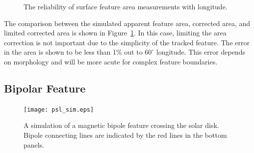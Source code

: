 \begin{figure}[!ht]
\caption{The reliability of surface feature area measurements with longitude.}\label{fig:spotareaerr}
\end{figure}

The comparison between the simulated apparent feature area, corrected area, and limited corrected area is shown in Figure~\ref{fig:spotareaerr}. In this case, limiting the area correction is not important due to the simplicity of the tracked feature. The error in the area is shown to be less than 1\% out to $60^{\circ}$ longitude. This error depends on morphology and will be more acute for complex feature boundaries.

\subsection{Bipolar Feature}\label{sect:bipolesim}

\begin{figure}[!ht]
\begin{center}
\texttt{[image: psl\_sim.eps]}
\end{center}
\caption{A simulation of a magnetic bipole feature crossing the solar disk. Bipole connecting lines are indicated by the red lines in the bottom panels.}\label{fig:bipolesim}
\end{figure}

